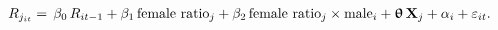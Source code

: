 \begin{equation}\label{equation1}
	R_{j_{it}} =	\, \beta_0\,R_{it-1} + \beta_1\,\text{female ratio}_j + \beta_2\,\text{female ratio}_j\times\text{male}_i  + \bm\uptheta\,\mathbf{X}_j + \alpha_i + \varepsilon_{it}.
\end{equation}
